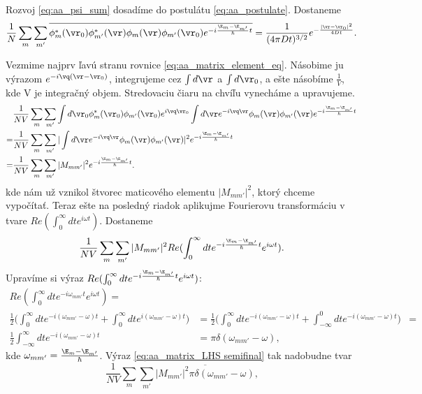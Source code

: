 Rozvoj  \eqref{eq:aa_psi_sum} dosadíme do postulátu \eqref{eq:aa_postulate}. Dostaneme
\begin{equation}
 \label{eq:aa_matrix_element_eq}
 \frac{1}{N}\sum_m \sum_{m'} \overline{\phi_m^*(\vr_0)\phi^*_{m'}(\vr)\phi_m(\vr)\phi_{m'}(\vr_0)e^{-i\frac{\E_m-\E_{m'}}{\hbar}t}}=\frac{1}{(4\pi Dt)^{3/2}}e^{-\frac{|\vr-\vr_0|^2}{4Dt}}\text{.}
\end{equation}

Vezmime najprv ľavú stranu rovnice \eqref{eq:aa_matrix_element_eq}. Násobime ju výrazom $e^{-i\vq(\vr-\vr_0)}$, integrujeme cez $\int d\vr$ a $\int d\vr_0$, a ešte násobíme $\frac{1}{V}$, kde V je integračný objem. 
Stredovaciu čiaru na chvíľu vynecháme a upravujeme.
\begin{align*}
&\frac{1}{NV}\sum_m \sum_{m'} \int d\vr_0  \phi_m^*(\vr_0)\phi_{m'}(\vr_0) e^{i\vq\vr_0} \int d\vr e^{-i\vq\vr}\phi_m(\vr)\phi_{m'}(\vr)e^{-i\frac{\E_m-\E_{m'}}{\hbar}t} \\
=&\frac{1}{NV}\sum_m \sum_{m'}|\int d\vr e^{-i\vq\vr}\phi_m(\vr)\phi_{m'}(\vr)|^2 e^{-i\frac{\E_m-\E_{m'}}{\hbar}t}\\
=&\frac{1}{NV}\sum_m \sum_{m'} |M_{mm'}|^2 e^{-i\frac{\E_m-\E_{m'}}{\hbar}t} \text{.}
\end{align*}
kde nám už vznikol štvorec maticového elementu $|M_{mm'}|^2$, ktorý chceme vypočítať. Teraz ešte na posledný riadok aplikujme Fourierovu transformáciu 
v tvare $Re (\int_0^{\infty} dt e^{i\omega t})$. Dostaneme
\begin{equation}
 \label{eq:aa_matrix_LHS semifinal}
\frac{1}{NV}\sum_m \sum_{m'} |M_{mm'}|^2 Re (\int_0^{\infty} dt e^{-i\frac{\E_m-\E_{m'}}{\hbar}t} e^{i\omega t}) \text{.}
\end{equation}
Upravíme si výraz $Re(\int_0^{\infty} dt e^{-i\frac{\E_m-\E_{m'}}{\hbar}t} e^{i\omega t})$:
\begin{align*}
 Re(\int_0^{\infty} dt e^{-i\omega_{mm'}t} e^{i\omega t})=&\\
 \frac{1}{2} \bigl(\int_0^{\infty} dt e^{-i(\omega_{mm'}-\omega)t}+\int_0^{\infty} dt e^{i(\omega_{mm'}-\omega)t}\bigr)&=
  \frac{1}{2} \bigl(\int_0^{\infty} dt e^{-i(\omega_{mm'}-\omega)t}+\int_{-\infty}^{0} dt e^{-i(\omega_{mm'}-\omega)t}\bigr)&=\\
  \frac{1}{2} \int_{-\infty}^{\infty} dt e^{-i(\omega_{mm'}-\omega)t}&=\pi \delta(\omega_{mm'}-\omega)\text{,}
\end{align*}
kde $\omega_{mm'}=\frac{\E_m-\E_{m'}}{\hbar}$. Výraz  \eqref{eq:aa_matrix_LHS semifinal} tak nadobudne tvar
\begin{equation}
 \label{eq:aa_matrix_LHS}
 \frac{1}{NV}\sum_m \sum_{m'} \overline{|M_{mm'}|^2 \pi \delta(\omega_{mm'}-\omega)} \text{,}
\end{equation}
